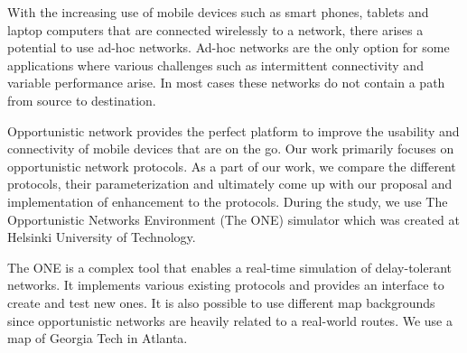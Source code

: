 \documentclass[conference]{IEEEtran}
\begin{document}
With the increasing use of mobile devices such as smart phones, tablets and laptop computers that are connected wirelessly to a network, there arises a potential to use ad-hoc networks. Ad-hoc networks are the only option for some applications where various challenges such as intermittent connectivity and variable performance arise. In most cases these networks do not contain a path from source to destination.

Opportunistic network provides the perfect platform to improve the usability and connectivity of mobile devices that are on the go. Our work primarily focuses on opportunistic network protocols. As a part of our work, we compare the different protocols, their parameterization and ultimately come up with our proposal and implementation of enhancement to the protocols. During the study, we use The Opportunistic Networks Environment (The ONE) simulator \cite{keranen-theone} which was created at Helsinki University of Technology.

The ONE is a complex tool that enables a real-time simulation of delay-tolerant networks. It implements various existing protocols and provides an interface to create and test new ones. It is also possible to use different map backgrounds since opportunistic networks are heavily related to a real-world routes. We use a map of Georgia Tech in Atlanta.

%
%

\end{document}
